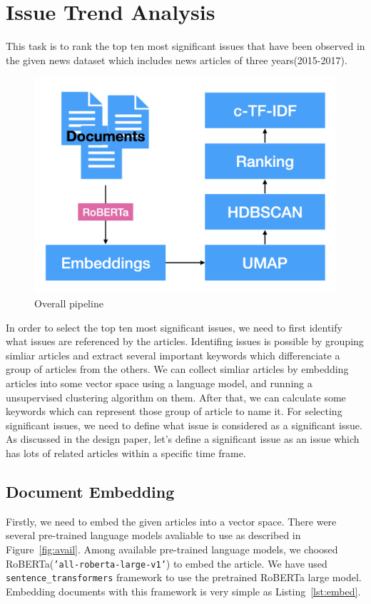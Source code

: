 \documentclass[sigconf,authorversion,nonacm]{acmart}
\begin{document}
\section{Issue Trend Analysis}

This task is to rank the top ten most significant issues
that have been observed in the given news dataset
which includes news articles of three years(2015-2017).

\begin{figure}[ht]
    \includegraphics[width=0.6\linewidth]{img/process.png}
    \caption{Overall pipeline}
    \label{fig:process}
\end{figure}

In order to select the top ten most significant issues,
we need to first identify what issues are referenced by the articles.
Identifing issues is possible by grouping simliar articles and extract several
important keywords which differenciate a group of articles from the others.
We can collect simliar articles by embedding articles into some vector space
using a language model, and running a unsupervised clustering algorithm on them.
After that, we can calculate some keywords which can represent those group of article
to name it.
For selecting significant issues, we need to define what issue is considered as
a significant issue.
As discussed in the design paper, let's define a significant issue as an issue
which has lots of related articles within a specific time frame.

\subsection{Document Embedding}
\label{sec:embed}
Firstly, we need to embed the given articles into a vector space.
There were several pre-trained language models avaliable to use as described in Figure~\ref{fig:avail}.
Among available pre-trained language models, we choosed RoBERTa(\texttt{'all-roberta-large-v1'})
to embed the article.
We have used \texttt{sentence_transformers} framework to use the pretrained RoBERTa large model.
Embedding documents with this framework is very simple as Listing~\ref{lst:embed}.
\end{document}
